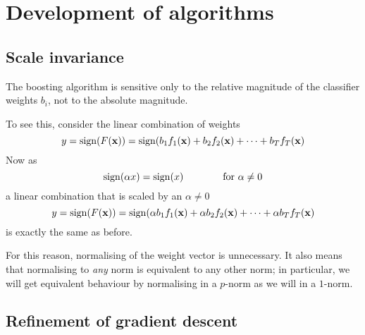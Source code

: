 

\chapter{Development of algorithms}

\section{Scale invariance}

The boosting algorithm is sensitive only to the relative magnitude of
the classifier weights $b_i$, not to the absolute magnitude.

To see this, consider the linear combination of weights
%
\begin{equation}
y = \mathrm{sign}(F(\mathbf{x})) = \mathrm{sign}(b_1 f_1(\mathbf{x}) + b_2 f_2(\mathbf{x}) + \cdots +
b_T f_T(\mathbf{x})
\end{equation}
%
Now as
%
\begin{equation}
\mathrm{sign}(\alpha x) = \mathrm{sign}(x) \qquad \qquad \mbox{for $\alpha \neq 0$}
\end{equation}
%
a linear combination that is scaled by an $\alpha \neq 0$
%
\begin{equation}
y = \mathrm{sign}(F(\mathbf{x})) = \mathrm{sign}(\alpha b_1 f_1(\mathbf{x}) + \alpha b_2 f_2(\mathbf{x})
+ \cdots + \alpha b_T f_T(\mathbf{x})
\end{equation}
%
is exactly the same as before.

For this reason, normalising of the weight vector is unnecessary.  It
also means that normalising to \emph{any} norm is equivalent to any
other norm; in particular, we will get equivalent behaviour by
normalising in a $p$-norm as we will in a $1$-norm.

\section{Refinement of gradient descent}

